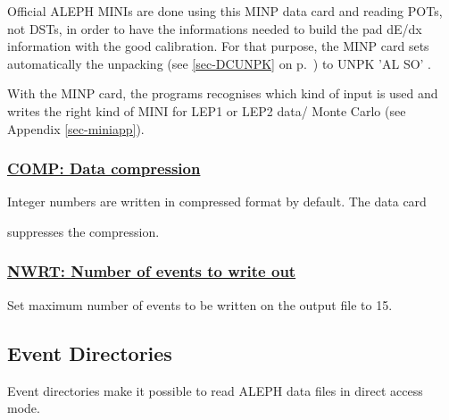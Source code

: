 Official ALEPH MINIs are done using this MINP data card and reading POTs, not DSTs, in order to have the 
informations needed to build the pad dE/dx information with the good calibration.
For that purpose, the MINP card sets automatically the unpacking (see \ref{sec-DCUNPK} on p.~\pageref{sec-DCUNPK})
 to UNPK 'AL SO' .

With the MINP card, the programs recognises which kind of input is used and writes the
right kind of MINI for LEP1 or LEP2 data/ Monte Carlo (see Appendix \ref{sec-miniapp}).

\par
\subsubsection{\underline{COMP: Data compression}}
\par
Integer numbers are written in
compressed format by default. The data card
\par
\begin{indentlist}{ 3.75cm}{ 4.00cm}
suppresses the compression.
\end{indentlist}
\par
\subsubsection{\underline{NWRT: Number of events to write out}}
\par
\par
\begin{indentlist}{ 3.75cm}{ 4.00cm}
Set maximum number of events to be written on the output file to 15.
\end{indentlist}
 
\subsection{\label{sec-DCEVD}Event Directories}
\par
Event directories make it possible to read ALEPH
data files in direct access mode.
\par
